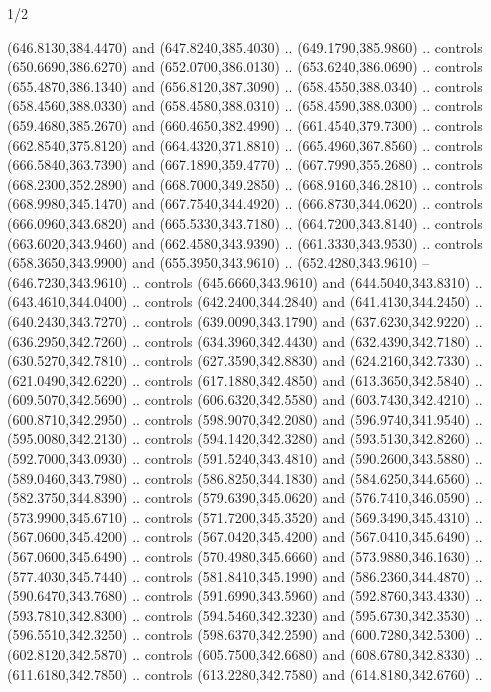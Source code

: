 \begin{flagdescription}{1/2}
\begin{scope}[xshift=0.5\flaglength,yshift=0.5\flagwidth,scale=\flagwidth/759]
\begin{scope}[y=0.8pt, x=0.8pt, yscale=-1,shift={(-720,-480)}]
\begin{scope}[cm={{1.14637,0.0,0.0,1.17117,(33.17849,82.1384)}}]
  (646.8130,384.4470) and (647.8240,385.4030) .. (649.1790,385.9860) .. controls
  (650.6690,386.6270) and (652.0700,386.0130) .. (653.6240,386.0690) .. controls
  (655.4870,386.1340) and (656.8120,387.3090) .. (658.4550,388.0340) .. controls
  (658.4560,388.0330) and (658.4580,388.0310) .. (658.4590,388.0300) .. controls
  (659.4680,385.2670) and (660.4650,382.4990) .. (661.4540,379.7300) .. controls
  (662.8540,375.8120) and (664.4320,371.8810) .. (665.4960,367.8560) .. controls
  (666.5840,363.7390) and (667.1890,359.4770) .. (667.7990,355.2680) .. controls
  (668.2300,352.2890) and (668.7000,349.2850) .. (668.9160,346.2810) .. controls
  (668.9980,345.1470) and (667.7540,344.4920) .. (666.8730,344.0620) .. controls
  (666.0960,343.6820) and (665.5330,343.7180) .. (664.7200,343.8140) .. controls
  (663.6020,343.9460) and (662.4580,343.9390) .. (661.3330,343.9530) .. controls
  (658.3650,343.9900) and (655.3950,343.9610) .. (652.4280,343.9610) --
  (646.7230,343.9610) .. controls (645.6660,343.9610) and (644.5040,343.8310) ..
  (643.4610,344.0400) .. controls (642.2400,344.2840) and (641.4130,344.2450) ..
  (640.2430,343.7270) .. controls (639.0090,343.1790) and (637.6230,342.9220) ..
  (636.2950,342.7260) .. controls (634.3960,342.4430) and (632.4390,342.7180) ..
  (630.5270,342.7810) .. controls (627.3590,342.8830) and (624.2160,342.7330) ..
  (621.0490,342.6220) .. controls (617.1880,342.4850) and (613.3650,342.5840) ..
  (609.5070,342.5690) .. controls (606.6320,342.5580) and (603.7430,342.4210) ..
  (600.8710,342.2950) .. controls (598.9070,342.2080) and (596.9740,341.9540) ..
  (595.0080,342.2130) .. controls (594.1420,342.3280) and (593.5130,342.8260) ..
  (592.7000,343.0930) .. controls (591.5240,343.4810) and (590.2600,343.5880) ..
  (589.0460,343.7980) .. controls (586.8250,344.1830) and (584.6250,344.6560) ..
  (582.3750,344.8390) .. controls (579.6390,345.0620) and (576.7410,346.0590) ..
  (573.9900,345.6710) .. controls (571.7200,345.3520) and (569.3490,345.4310) ..
  (567.0600,345.4200) .. controls (567.0420,345.4200) and (567.0410,345.6490) ..
  (567.0600,345.6490) .. controls (570.4980,345.6660) and (573.9880,346.1630) ..
  (577.4030,345.7440) .. controls (581.8410,345.1990) and (586.2360,344.4870) ..
  (590.6470,343.7680) .. controls (591.6990,343.5960) and (592.8760,343.4330) ..
  (593.7810,342.8300) .. controls (594.5460,342.3230) and (595.6730,342.3530) ..
  (596.5510,342.3250) .. controls (598.6370,342.2590) and (600.7280,342.5300) ..
  (602.8120,342.5870) .. controls (605.7500,342.6680) and (608.6780,342.8330) ..
  (611.6180,342.7850) .. controls (613.2280,342.7580) and (614.8180,342.6760) ..

\end{scope}
\end{scope}
\end{scope}
\end{flagdescription}
